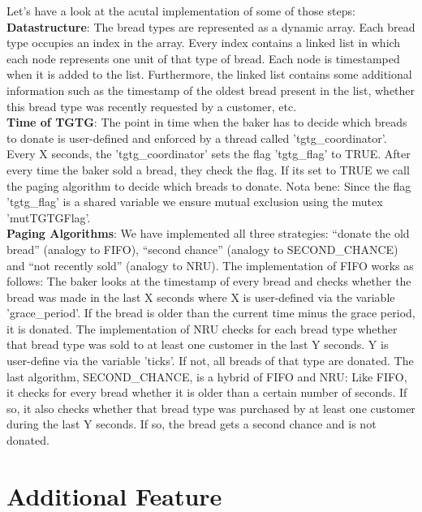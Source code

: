 \documentclass[11pt]{article}
\begin{document}
Let's have a look at the acutal implementation of some of those steps:\\

\textbf{Datastructure}: The bread types are represented as a dynamic array. Each bread type occupies an index in the array. Every index contains a linked list in which each node represents one unit of that type of bread. Each node is timestamped when it is added to the list. Furthermore, the linked list contains some additional information such as the timestamp of the oldest bread present in the list, whether this bread type was recently requested by a customer, etc.\\

\textbf{Time of TGTG}: The point in time when the baker has to decide which breads to donate is user-defined and enforced by a thread called 'tgtg\_coordinator'. Every X seconds, the 'tgtg\_coordinator' sets the flag 'tgtg\_flag' to TRUE. After every time the baker sold a bread, they check the flag. If its set to TRUE we call the paging algorithm to decide which breads to donate. Nota bene: Since the flag 'tgtg\_flag' is a shared variable we ensure mutual exclusion using the mutex 'mutTGTGFlag'.\\

\textbf{Paging Algorithms}: We have implemented all three strategies: ``donate the old bread'' (analogy to FIFO), ``second chance'' (analogy to SECOND\_CHANCE) and ``not recently sold'' (analogy to NRU). The implementation of FIFO works as follows: The baker looks at the timestamp of every bread and checks whether the bread was made in the last X seconds where X is user-defined via the variable 'grace\_period'. If the bread is older than the current time minus the grace period, it is donated. The implementation of NRU checks for each bread type whether that bread type was sold to at least one customer in the last Y seconds. Y is user-define via the variable 'ticks'. If not, all breads of that type are donated. The last algorithm, SECOND\_CHANCE, is a hybrid of FIFO and NRU: Like FIFO, it checks for every bread whether it is older than a certain number of seconds. If so, it also checks whether that bread type was purchased by at least one customer during the last Y seconds. If so, the bread gets a second chance and is not donated.\\

\section{Additional Feature}
\label{sec:orgb10188e}
\end{document}
